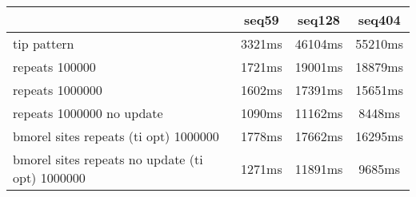 \begin{tabular}{|l|c|c|c|}
\hline
 & seq59 & seq128 & seq404  \\
\hline
tip pattern & 3321ms & 46104ms & 55210ms\\
\hline
repeats 100000 & 1721ms & 19001ms & 18879ms\\
\hline
repeats 1000000 & 1602ms & 17391ms & 15651ms\\
\hline
repeats 1000000 no update & 1090ms & 11162ms & 8448ms\\
\hline
bmorel sites repeats (ti opt) 1000000 & 1778ms & 17662ms & 16295ms\\
\hline
bmorel sites repeats no update (ti opt) 1000000 & 1271ms & 11891ms & 9685ms\\
\hline
\end{tabular}
